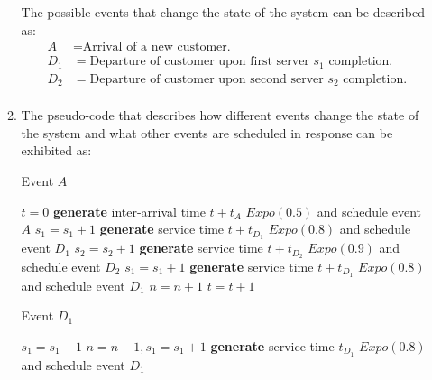 \documentclass{article}
\begin{document}
\begin{enumerate}
\begin{enumerate}
        The possible events that change the state of the system can be described as:
        \begin{equation}
            \begin{split}
                A &= \text{Arrival of a new customer.}\\
                D_1 &= \text{Departure of customer upon first server $s_1$ completion.}\\
                D_2 &= \text{Departure of customer upon second server $s_2$ completion.}\\
            \end{split}
        \end{equation}

        \item The pseudo-code that describes how different events change the state of the system and what other events are scheduled in response can be exhibited as:
        
\begin{algorithm}[H]
\caption{Event $A$}
\begin{algorithmic}[1]
\STATE $t = 0$
    \STATE \textbf{generate} inter-arrival time $t+t_A$ $Expo(0.5)$ and schedule event $A$
        \STATE $s_1 = s_1 + 1$
        \STATE \textbf{generate} service time $t+t_D_1$ $Expo(0.8)$ and schedule event $D_1$
    \ENDIF
        \STATE $s_2 = s_2 + 1$
        \STATE \textbf{generate} service time $t+t_D_2$ $Expo(0.9)$ and schedule event $D_2$
    \ENDIF
        \STATE $s_1 = s_1 + 1$
        \STATE \textbf{generate} service time $t+t_D_1$ $Expo(0.8)$ and schedule event $D_1$
    \ENDIF
        \STATE $n = n + 1$
    \ENDIF
    \STATE $t=t+1$
\ENDWHILE
\end{algorithmic}
\end{algorithm}

\begin{algorithm}[H]
\caption{Event $D_1$}
\begin{algorithmic}[1]

    \STATE $s_1 = s_1 - 1$
        \STATE $n = n - 1, s_1 = s_1 + 1$
        \STATE \textbf{generate} service time $t_D_1$ $Expo(0.8)$ and schedule event $D_1$
    \ENDIF

\end{algorithmic}
\end{algorithm}
\begin{algorithm}[H]


\end{algorithm}
\end{enumerate}
\end{enumerate}
\end{document}
